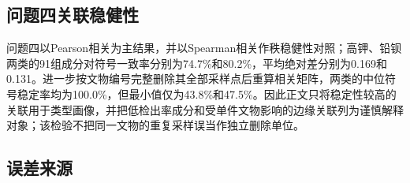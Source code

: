 \subsection{问题四关联稳健性}

问题四以Pearson相关为主结果，并以Spearman相关作秩稳健性对照；高钾、铅钡两类的91组成分对符号一致率分别为74.7\%和80.2\%，平均绝对差分别为0.169和0.131。进一步按文物编号完整删除其全部采样点后重算相关矩阵，两类的中位符号稳定率均为100.0\%，但最小值仅为43.8\%和47.5\%。因此正文只将稳定性较高的关联用于类型画像，并把低检出率成分和受单件文物影响的边缘关联列为谨慎解释对象；该检验不把同一文物的重复采样误当作独立删除单位。

\subsection{误差来源}

